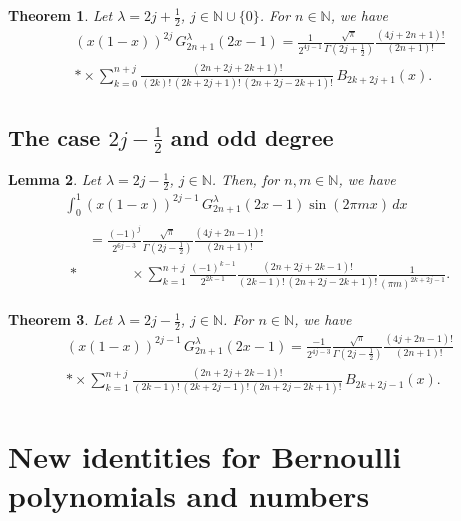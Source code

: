 \documentclass[a4paper,reqno]{amsart}
\newcommand{\N}{\mathbb{N}}
\theoremstyle{plain}
\newtheorem{Teor}{Theorem}[section]
\newtheorem{Lema}[Teor]{Lemma}
\numberwithin{equation}{section}
\theoremstyle{remark}
\begin{document}
\begin{Teor} 
Let $\lambda = 2j+ \frac{1}{2}$, $j\in \N\cup\{0\}$. For $n\in\N$, we have
\begin{multline}
\label{gegen2j+impar}
  (x(1-x))^{2j}\,G_{2n+1}^\lambda(2x-1)
  = \frac{1}{2^{4j-1}} \frac{\sqrt{\pi}}{\Gamma(2j+ \frac{1}{2})} \frac{(4j+2n+1)!}{(2n+1)!}
  \\*
  \times
  \sum_{k=0}^{n+j} \frac{(2n+2j+2k+1)!}{(2k)!\,(2k+2j+1)!\,(2n+2j-2k+1)!}\,B_{2k+2j+1}(x).
\end{multline}
\end{Teor}

\subsection{The case $2j-\frac{1}{2}$ and odd degree}

\begin{Lema} 
Let $\lambda = 2j-\frac{1}{2}$, $j\in \N$. Then, for $n,m\in\N$, we have
\begin{multline*}
  \int_0^1 (x(1-x))^{2j-1}\,G_{2n+1}^\lambda (2x-1) \sin(2\pi mx)\,dx
  \\
\begin{aligned}
  &= \frac{(-1)^{j}}{2^{6j-3}} \frac{\sqrt{\pi}}{\Gamma(2j-\frac{1}{2})} \frac{(4j+2n-1)!}{(2n+1)!}
  \\*
  &\qquad\quad \times
  \sum_{k=1}^{n+j} \frac{(-1)^{k-1}}{2^{2k-1}} \frac{(2n+2j+2k-1)!}{(2k-1)!\,(2n+2j-2k+1)!} 
  \frac{1}{(\pi m)^{2k+2j-1}}.
\end{aligned}
\end{multline*}
\end{Lema}

\begin{Teor} 
\label{Teor:gegen2j-impar}
Let $\lambda = 2j-\frac{1}{2}$, $j\in \N$. For $n\in\N$, we have
\begin{multline}
\label{gegen2j-impar}
  (x(1-x))^{2j-1} \, G_{2n+1}^\lambda(2x-1)
  = \frac{-1}{2^{4j-3}} \frac{\sqrt{\pi}}{\Gamma(2j-\frac{1}{2})} \frac{(4j+2n-1)!}{(2n+1)!}
  \\*
  \times
  \sum_{k=1}^{n+j} \frac{(2n+2j+2k-1)!}{(2k-1)!\,(2k+2j-1)!\,(2n+2j-2k+1)!}\,B_{2k+2j-1}(x).
\end{multline}
\end{Teor}

\section{New identities for Bernoulli polynomials and numbers}
\label{sec:consequences}
\end{document}
